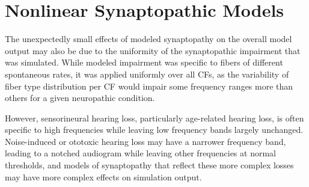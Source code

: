 \section{Nonlinear Synaptopathic Models} %
\label{sec:nonlinear_synaptopathic_models}
The unexpectedly small effects of modeled synaptopathy on the overall model output may also be due to the uniformity of the synaptopathic impairment that was simulated.  While modeled impairment was specific to fibers of different spontaneous rates, it was applied uniformly over all CFs, as the variability of fiber type distribution per CF would impair some frequency ranges more than others for a given neuropathic condition. 

However, sensorineural hearing loss, particularly age-related hearing loss, is often specific to high frequencies while leaving low frequency bands largely unchanged.   Noise-induced or ototoxic hearing loss may have a narrower frequency band, leading to a notched audiogram while leaving other frequencies at normal thresholds, and models of synaptopathy that reflect these more complex losses may have more complex effects on simulation output. 
